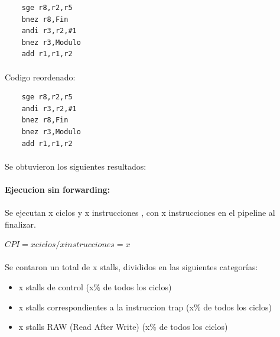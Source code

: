 \documentclass[a4paper,11pt]{article}
\begin{document}
\begin{enumerate}
\begin{center}
\begin{verbatim}
	sge r8,r2,r5
	bnez r8,Fin 
	andi r3,r2,#1 
	bnez r3,Modulo 
	add r1,r1,r2
\end{verbatim}
\end{center}

\paragraph{} 
Codigo reordenado:

\begin{center}
\begin{verbatim}
	sge r8,r2,r5 
	andi r3,r2,#1 
	bnez r8,Fin 	 
	bnez r3,Modulo 
	add r1,r1,r2
\end{verbatim}
\end{center}

\paragraph{}
Se obtuvieron los siguientes resultados:

\paragraph{Ejecucion sin forwarding:}

\paragraph{}
Se ejecutan x ciclos y x instrucciones , con x instrucciones en el  pipeline al finalizar.

\begin{center}
$CPI = x ciclos / x instrucciones = x $
\end{center}

\paragraph{}

Se contaron un total de x stalls, divididos en las siguientes categor\'ias:

\begin{itemize}
 \item x stalls de control (x\% de todos los ciclos)
 \item  x  stalls correspondientes a la instruccion trap (x\% de todos los ciclos)
 \item  x stalls RAW (Read After Write) (x\% de todos los ciclos)
\end{itemize}


\end{enumerate}
\end{document}
